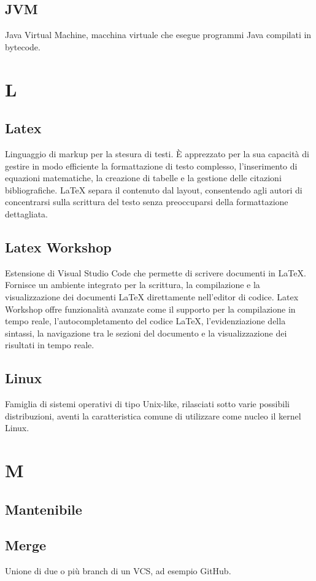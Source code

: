\documentclass[12pt]{article}
\begin{document}
		\subsection{JVM}
			Java Virtual Machine, macchina virtuale che esegue programmi Java compilati in bytecode.
	\clearpage
	\section{L}
		\subsection{Latex}
			Linguaggio di markup per la stesura di testi. È apprezzato per la sua capacità di gestire in modo efficiente la formattazione di testo complesso, l'inserimento di equazioni matematiche, la creazione di tabelle e la gestione delle citazioni bibliografiche. LaTeX separa il contenuto dal layout, consentendo agli autori di concentrarsi sulla scrittura del testo senza preoccuparsi della formattazione dettagliata. 

		\subsection{Latex Workshop}
			Estensione di Visual Studio Code che permette di scrivere documenti in LaTeX. Fornisce un ambiente integrato per la scrittura, la compilazione e la visualizzazione dei documenti LaTeX direttamente nell'editor di codice. Latex Workshop offre funzionalità avanzate come il supporto per la compilazione in tempo reale, l'autocompletamento del codice LaTeX, l'evidenziazione della sintassi, la navigazione tra le sezioni del documento e la visualizzazione dei risultati in tempo reale.
		\subsection{Linux}
			Famiglia di sistemi operativi di tipo Unix-like, rilasciati sotto varie possibili distribuzioni, aventi la caratteristica comune di utilizzare come nucleo il kernel Linux.

	\clearpage
	\section{M}
		\subsection{Mantenibile}
		\subsection{Merge}
			Unione di due o più branch di un VCS, ad esempio GitHub.
\end{document}
